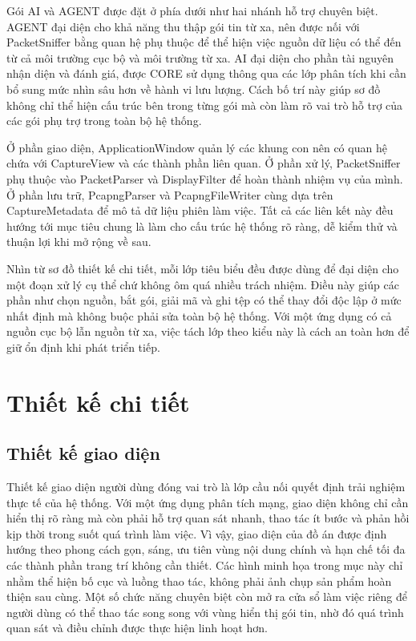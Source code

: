 \documentclass[../DoAn.tex]{subfiles}
\begin{document}
Gói AI và AGENT được đặt ở phía dưới như hai nhánh hỗ trợ chuyên biệt. AGENT đại diện cho khả năng thu thập gói tin từ xa, nên được nối với PacketSniffer bằng quan hệ phụ thuộc để thể hiện việc nguồn dữ liệu có thể đến từ cả môi trường cục bộ và môi trường từ xa. AI đại diện cho phần tài nguyên nhận diện và đánh giá, được CORE sử dụng thông qua các lớp phân tích khi cần bổ sung mức nhìn sâu hơn về hành vi lưu lượng. Cách bố trí này giúp sơ đồ không chỉ thể hiện cấu trúc bên trong từng gói mà còn làm rõ vai trò hỗ trợ của các gói phụ trợ trong toàn bộ hệ thống.

Ở phần giao diện, ApplicationWindow quản lý các khung con nên có quan hệ chứa với CaptureView và các thành phần liên quan. Ở phần xử lý, PacketSniffer phụ thuộc vào PacketParser và DisplayFilter để hoàn thành nhiệm vụ của mình. Ở phần lưu trữ, PcapngParser và PcapngFileWriter cùng dựa trên CaptureMetadata để mô tả dữ liệu phiên làm việc. Tất cả các liên kết này đều hướng tới mục tiêu chung là làm cho cấu trúc hệ thống rõ ràng, dễ kiểm thử và thuận lợi khi mở rộng về sau.

Nhìn từ sơ đồ thiết kế chi tiết, mỗi lớp tiêu biểu đều được dùng để đại diện cho một đoạn xử lý cụ thể chứ không ôm quá nhiều trách nhiệm. Điều này giúp các phần như chọn nguồn, bắt gói, giải mã và ghi tệp có thể thay đổi độc lập ở mức nhất định mà không buộc phải sửa toàn bộ hệ thống. Với một ứng dụng có cả nguồn cục bộ lẫn nguồn từ xa, việc tách lớp theo kiểu này là cách an toàn hơn để giữ ổn định khi phát triển tiếp.

\section{Thiết kế chi tiết}

\subsection{Thiết kế giao diện}
Thiết kế giao diện người dùng đóng vai trò là lớp cầu nối quyết định trải nghiệm thực tế của hệ thống. Với một ứng dụng phân tích mạng, giao diện không chỉ cần hiển thị rõ ràng mà còn phải hỗ trợ quan sát nhanh, thao tác ít bước và phản hồi kịp thời trong suốt quá trình làm việc. Vì vậy, giao diện của đồ án được định hướng theo phong cách gọn, sáng, ưu tiên vùng nội dung chính và hạn chế tối đa các thành phần trang trí không cần thiết. Các hình minh họa trong mục này chỉ nhằm thể hiện bố cục và luồng thao tác, không phải ảnh chụp sản phẩm hoàn thiện sau cùng. Một số chức năng chuyên biệt còn mở ra cửa sổ làm việc riêng để người dùng có thể thao tác song song với vùng hiển thị gói tin, nhờ đó quá trình quan sát và điều chỉnh được thực hiện linh hoạt hơn.
\end{document}
